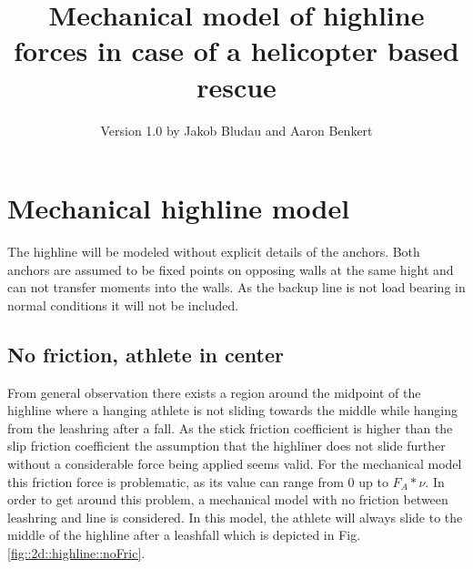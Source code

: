 \documentclass[a4paper,10pt]{scrartcl}
\title{Mechanical model of highline forces in case of a helicopter based rescue}
\author{Version 1.0 by Jakob Bludau and Aaron Benkert}
\begin{document}
\maketitle

\section{Mechanical highline model}
The highline will be modeled without explicit details of the anchors. Both anchors are assumed to be fixed points on opposing walls at the same hight and can not transfer moments into the walls. As the backup line is not load bearing in normal conditions it will not be included.

\subsection{No friction, athlete in center}
From general observation there exists a region around the midpoint of the highline where a hanging athlete is not sliding towards the middle while hanging from the leashring after a fall. As the stick friction coefficient is higher than the slip friction coefficient the assumption that the highliner does not slide further without a considerable force being applied seems valid.
For the mechanical model this friction force is problematic, as its value can range from 0 up to $F_A*\nu$. In order to get around this problem, a mechanical model with no friction between leashring and line is considered. In this model, the athlete will always slide to the middle of the highline after a leashfall which is depicted in Fig. \ref{fig::2d::highline::noFric}.
\end{document}
